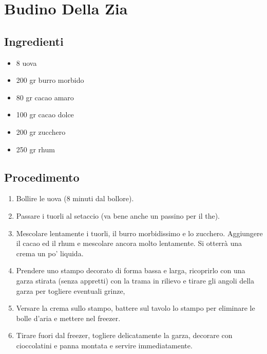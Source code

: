 \section{Budino Della Zia}
\subsection{Ingredienti}
\begin{itemize}
\item 8 uova  
\item 200 gr burro morbido  
\item 80 gr cacao amaro  
\item 100 gr cacao dolce  
\item 200 gr zucchero  
\item 250 gr rhum
\end{itemize}
\subsection{Procedimento}
\begin{enumerate}
\item  Bollire le uova (8 minuti dal bollore).  
\item  Passare i tuorli al setaccio (va bene anche un passino per il the).   
\item  Mescolare lentamente i tuorli, il burro morbidissimo e lo zucchero. Aggiungere il cacao ed il rhum e mescolare ancora molto lentamente. Si otterrà una crema un po' liquida.  
\item  Prendere uno stampo decorato di forma bassa e larga, ricoprirlo con una garza stirata (senza appretti) con la trama in rilievo e tirare gli angoli della garza per togliere eventuali grinze,   
\item  Versare la crema sullo stampo, battere sul tavolo lo stampo per eliminare le bolle d'aria e mettere nel freezer.   
\item  Tirare fuori dal freezer, togliere delicatamente la garza, decorare con cioccolatini e panna montata e servire immediatamente.
\end{enumerate}
